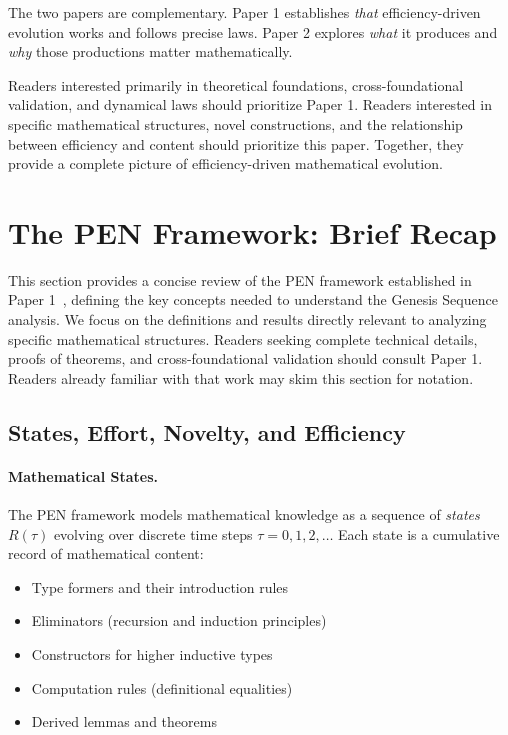 \documentclass[11pt]{article}
\theoremstyle{definition}
\begin{document}
The two papers are complementary. Paper 1 establishes \emph{that} efficiency-driven evolution works and follows precise laws. Paper 2 explores \emph{what} it produces and \emph{why} those productions matter mathematically.

Readers interested primarily in theoretical foundations, cross-foundational validation, and dynamical laws should prioritize Paper 1. Readers interested in specific mathematical structures, novel constructions, and the relationship between efficiency and content should prioritize this paper. Together, they provide a complete picture of efficiency-driven mathematical evolution.

\section{The PEN Framework: Brief Recap}
\label{sec:framework-recap}

This section provides a concise review of the PEN framework established in Paper 1~\cite{lande2025unbounded}, defining the key concepts needed to understand the Genesis Sequence analysis. We focus on the definitions and results directly relevant to analyzing specific mathematical structures. Readers seeking complete technical details, proofs of theorems, and cross-foundational validation should consult Paper 1. Readers already familiar with that work may skim this section for notation.

\subsection{States, Effort, Novelty, and Efficiency}

\paragraph{Mathematical States.}

The PEN framework models mathematical knowledge as a sequence of \emph{states} $R(\tau)$ evolving over discrete time steps $\tau = 0, 1, 2, \ldots$ Each state is a cumulative record of mathematical content:
\begin{itemize}
\item Type formers and their introduction rules
\item Eliminators (recursion and induction principles)  
\item Constructors for higher inductive types
\item Computation rules (definitional equalities)
\item Derived lemmas and theorems
\end{itemize}
\end{document}
